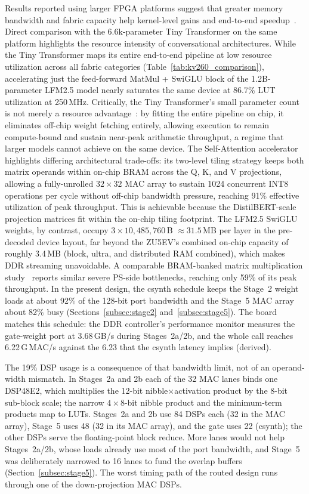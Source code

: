 Results reported using larger FPGA platforms suggest that greater memory bandwidth and
fabric capacity help kernel-level gains and end-to-end speedup~\cite{FTRANS}. Direct
comparison with the 6.6k-parameter Tiny Transformer on the same platform highlights the
resource intensity of conversational architectures. While the Tiny Transformer maps its
entire end-to-end pipeline at low resource utilization across all fabric categories
(Table~\ref{tab:kv260_comparison}), accelerating just the feed-forward MatMul + SwiGLU
block of the 1.2B-parameter LFM2.5 model nearly saturates the same device at 86.7\% LUT
utilization at 250\,MHz. Critically, the Tiny Transformer's small parameter count is not
merely a resource advantage~\cite{11310944tin}: by fitting the entire pipeline on chip,
it eliminates off-chip weight fetching entirely, allowing execution to remain
compute-bound and sustain near-peak arithmetic throughput, a regime that larger models
cannot achieve on the same device. The Self-Attention
accelerator~\cite{li2025fpgabasedhardware} highlights differing architectural trade-offs:
its two-level tiling strategy keeps both matrix operands within on-chip BRAM across the
Q, K, and V projections, allowing a fully-unrolled $32\times32$ MAC array to sustain 1024
concurrent INT8 operations per cycle without off-chip bandwidth pressure, reaching 91\%
effective utilization of peak throughput. This is achievable because the DistilBERT-scale
projection matrices fit within the on-chip tiling footprint. The LFM2.5 SwiGLU weights,
by contrast, occupy $3 \times 10{,}485{,}760$\,B $\approx 31.5$\,MB per layer in the
pre-decoded device layout, far beyond the ZU5EV's combined on-chip capacity of roughly
3.4\,MB (block, ultra, and distributed RAM combined), which makes DDR streaming
unavoidable. A comparable BRAM-banked matrix multiplication study~\cite{11311069}
reports similar severe PS-side bottlenecks, reaching only 59\% of its peak throughput.
In the present design, the csynth schedule keeps the Stage~2 weight loads at about 92\%
of the 128-bit port bandwidth and the Stage~5 MAC array about 82\% busy
(Sections~\ref{subsec:stage2} and~\ref{subsec:stage5}). The board matches this
schedule: the DDR controller's performance monitor measures the gate-weight port at
3.68\,GB/s during Stages~2a/2b, and the whole call reaches 6.22\,G\,MAC/s against the
6.23 that the csynth latency implies (derived).

The 19\% DSP usage is a consequence of that bandwidth limit, not of an operand-width
mismatch. In Stages~2a and 2b each of the 32 MAC lanes binds one DSP48E2, which
multiplies the 12-bit nibble$\times$activation product by the 8-bit sub-block scale; the
narrow $4\times8$-bit nibble product and the minimum-term products map to LUTs. Stages~2a
and 2b use 84 DSPs each (32 in the MAC array), Stage~5 uses 48 (32 in its MAC array), and
the gate uses 22 (csynth); the other DSPs serve the floating-point block reduce. More lanes would not help Stages~2a/2b, whose loads already use most of
the port bandwidth, and Stage~5 was deliberately narrowed to 16 lanes to fund the
overlap buffers (Section~\ref{subsec:stage5}). The worst timing path of the routed design
runs through one of the down-projection MAC DSPs.

